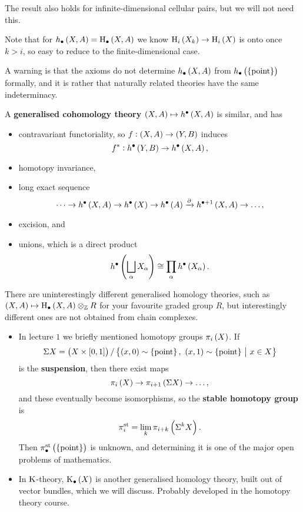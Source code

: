 The result also holds for infinite-dimensional cellular pairs, but we will not need this.

\begin{example*}
Note that for $ h_\bullet\br{X, A} = \H_\bullet\br{X, A} $ we know $ \H_i\br{X_k} \to \H_i\br{X} $ is onto once $ k > i $, so easy to reduce to the finite-dimensional case.
\end{example*}

A warning is that the axioms do not determine $ h_\bullet\br{X, A} $ from $ h_\bullet\br{\pt} $ formally, and it is rather that naturally related theories have the same indeterminacy.

\begin{remark*}
A \textbf{generalised cohomology theory} $ \br{X, A} \mapsto h^\bullet\br{X, A} $ is similar, and has
\begin{itemize}
\item contravariant functoriality, so $ f : \br{X, A} \to \br{Y, B} $ induces
$$ f^* : h^\bullet\br{Y, B} \to h^\bullet\br{X, A}, $$
\item homotopy invariance,
\item long exact sequence
$$ \dots \to h^\bullet\br{X, A} \to h^\bullet\br{X} \to h^\bullet\br{A} \xrightarrow{\da} h^{\bullet + 1}\br{X, A} \to \dots, $$
\item excision, and
\item unions, which is a direct product
$$ h^\bullet\br{\bigsqcup_\alpha X_\alpha} \cong \prod_\alpha h^\bullet\br{X_\alpha}. $$
\end{itemize}
\end{remark*}

\pagebreak

\begin{remark*}
There are uninterestingly different generalised homology theories, such as $ \br{X, A} \mapsto \H_\bullet\br{X, A} \otimes_\ZZ R $ for your favourite graded group $ R $, but interestingly different ones are not obtained from chain complexes.
\begin{itemize}
\item In lecture $ 1 $ we briefly mentioned homotopy groups $ \pi_i\br{X} $. If
$$ \Sigma X = \br{X \times \sbr{0, 1}} / \cbr{\br{x, 0} \sim \pt, \ \br{x, 1} \sim \pt \st x \in X} $$
is the \textbf{suspension}, then there exist maps
$$ \pi_i\br{X} \to \pi_{i + 1}\br{\Sigma X} \to \dots, $$
and these eventually become isomorphisms, so the \textbf{stable homotopy group} is
$$ \pi_i^{\s\t} = \lim_k \pi_{i + k}\br{\Sigma^kX}. $$
Then $ \pi_\bullet^{\s\t}\br{\pt} $ is unknown, and determining it is one of the major open problems of mathematics.
\item In $ \mathrm{K} $-theory, $ \K_\bullet\br{X} $ is another generalised homology theory, built out of vector bundles, which we will discuss. Probably developed in the homotopy theory course.
\end{itemize}
\end{remark*}

